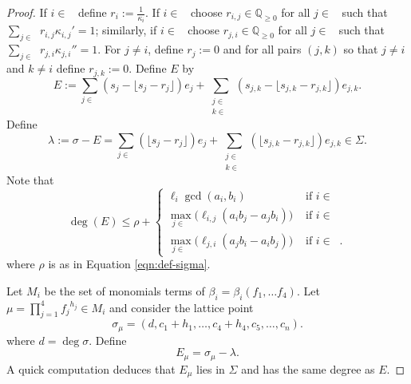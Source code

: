 \documentclass{amsart}
\theoremstyle{plain}
\theoremstyle{definition}
\theoremstyle{remark}
\numberwithin{equation}{section}
\newcommand\bq{{\mathbb Q}}
\newcommand\bida{a}
\newcommand\bidb{b}
\DeclareMathOperator{\Te}{T_=}
\DeclareMathOperator{\Tp}{T_+}
\DeclareMathOperator{\Tm}{T_-}
\begin{document}
\begin{proof}
If $i\in \Te$ define $r_i := \frac{1}{\kappa_i}$.  If $i\in \Tp$ choose $r_{i,j}\in \bq_{\ge 0}$ for all $j\in \Tm$ such that $\sum_{j\in \Tm} r_{i,j}\kappa_{i,j}' = 1$; similarly, if $i\in \Tm$ choose $r_{j,i}\in \bq_{\ge 0}$ for all $j\in \Tp$ such that $\sum_{j\in \Tm} r_{j,i}\kappa_{j,i}'' = 1$.  For $j\ne i$, define $r_j := 0$ and for all pairs $(j,k)$ so that $j \neq i$ and $k \neq i$ define $r_{j,k} := 0$.
Define $E$ by
\begin{equation}\label{eqn:hirz-E-translation}
	E := \sum_{j\in \Te} (s_j - \lfloor s_j - r_j\rfloor) e_j + \sum_{\substack{j\in \Tp \\ k\in \Tm}} (s_{j,k} - \lfloor s_{j,k} - r_{j,k}\rfloor)e_{j,k}.
\end{equation}
Define
\begin{equation}\label{eqn:defn-lambda}
	\lambda := \sigma - E = \sum_{j\in \Te} (\lfloor s_j - r_j\rfloor) e_j + \sum_{\substack{j\in \Tp \\ k\in \Tm}} ( \lfloor s_{j,k} - r_{j,k}\rfloor)e_{j,k}\in \Sigma.
 \end{equation}
Note that
\[
	\deg(E) \le \rho + \begin{cases}
	\ell_i \gcd(\bida_i, \bidb_i)	&\mbox{ if } i \in \Te \\
	\max_{j \in \Tm} \bigl(\ell_{i, j} (\bida_i \bidb_j - \bida_j \bidb_i)\bigr)
	&\mbox{ if } i \in \Tp \\
	\max_{j \in \Tp} \bigl(\ell_{j, i} (\bida_j \bidb_ i - \bida_i \bidb_j) \bigr)
	&\mbox{ if } i \in \Tm. \end{cases}
\]
where $\rho$ is as in Equation \ref{eqn:def-sigma}.

Let $M_i$ be the set of monomials terms of $\beta_i = \beta_i(f_1, \ldots f_4)$.  Let $\mu = \prod_{j=1}^4
{f_j}^{h_j}\in M_i$ and consider the lattice point 
\[
	\sigma_\mu = (d, c_1 + h_1, \ldots, c_4+h_4, c_5, \ldots, c_n).
\]
where $d = \deg \sigma$.
Define 
\[
	E_\mu = \sigma_\mu - \lambda.
\]
A quick computation deduces that $E_\mu$ lies in $\Sigma$ 
and has the same degree as $E$.


\end{proof}
\end{document}

